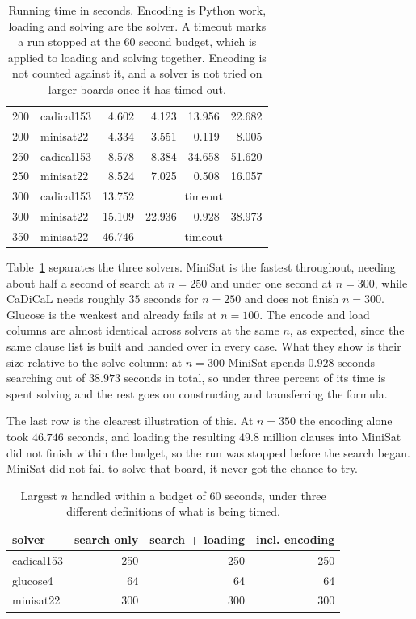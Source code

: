 \documentclass[11pt,a4paper]{article}
\begin{document}
\begin{table}[H]
\begin{tabular}{rlrrrr}
200 & cadical153 & 4.602 & 4.123 & 13.956 & 22.682 \\
200 & minisat22  & 4.334 & 3.551 & 0.119 & 8.005 \\
250 & cadical153 & 8.578 & 8.384 & 34.658 & 51.620 \\
250 & minisat22  & 8.524 & 7.025 & 0.508 & 16.057 \\
300 & cadical153 & 13.752 & \multicolumn{3}{c}{timeout} \\
300 & minisat22  & 15.109 & 22.936 & 0.928 & 38.973 \\
350 & minisat22  & 46.746 & \multicolumn{3}{c}{timeout} \\
\bottomrule
\end{tabular}
\caption{Running time in seconds. Encoding is Python work, loading and
solving are the solver. A timeout marks a run stopped at the 60 second
budget, which is applied to loading and solving together. Encoding is not
counted against it, and a solver is not tried on larger boards once it has
timed out.}
\label{tab:times}
\end{table}

Table~\ref{tab:times} separates the three solvers. MiniSat is the
fastest throughout, needing about half a second of search at $n=250$ and
under one second at $n=300$, while CaDiCaL needs roughly $35$ seconds for
$n=250$ and does not finish $n=300$. Glucose is the weakest and already
fails at $n=100$. The encode and load columns are almost identical across
solvers at the same $n$, as expected, since the same clause list is built
and handed over in every case. What they show is their size relative to the
solve column: at $n=300$ MiniSat spends $0.928$ seconds
searching out of $38.973$ seconds in total, so under three percent of its
time is spent solving and the rest goes on constructing and transferring the
formula.

The last row is the clearest illustration of this. At $n=350$ the encoding
alone took $46.746$ seconds, and loading the resulting $49.8$ million
clauses into MiniSat did not finish within the budget, so the run was
stopped before the search began. MiniSat did not fail to solve that board,
it never got the chance to try.

\begin{table}[H]
\centering
\begin{tabular}{lrrr}
\toprule
solver & search only & search + loading & incl. encoding \\
\midrule
cadical153 & 250 & 250 & 250 \\
glucose4   & 64  & 64  & 64 \\
minisat22  & 300 & 300 & 300 \\
\bottomrule
\end{tabular}
\caption{Largest $n$ handled within a budget of 60 seconds, under three
different definitions of what is being timed.}
\label{tab:maxn}
\end{table}
\end{document}
